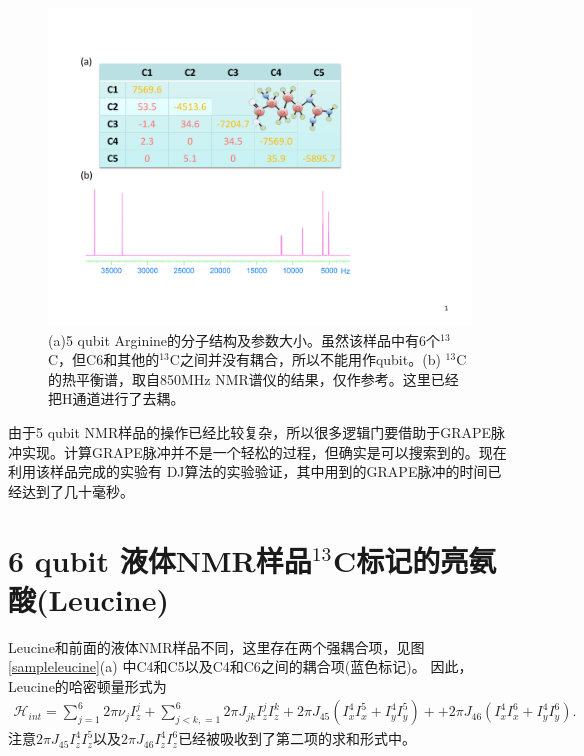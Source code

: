 \begin{figure}[htbp]
            \begin{center}
              \includegraphics[width= 0.8\columnwidth]{figures/samplearginine.pdf}
              \caption{(a)5 qubit Arginine的分子结构及参数大小。虽然该样品中有6个$^{13}$C，但C6和其他的$^{13}$C之间并没有耦合，所以不能用作qubit。(b) $^{13}$C的热平衡谱，取自850MHz NMR谱仪的结果，仅作参考。这里已经把H通道进行了去耦。}
              \label{samplearginine}
            \end{center}
\end{figure}

由于5 qubit NMR样品的操作已经比较复杂，所以很多逻辑门要借助于GRAPE脉冲实现。计算GRAPE脉冲并不是一个轻松的过程，但确实是可以搜索到的。现在利用该样品完成的实验有
 DJ算法的实验验证\cite{app27}，其中用到的GRAPE脉冲的时间已经达到了几十毫秒。

\section{6 qubit 液体NMR样品$^{13}$C标记的亮氨酸(Leucine)}

Leucine和前面的液体NMR样品不同，这里存在两个强耦合项，见图\ref{sampleleucine}(a) 中C4和C5以及C4和C6之间的耦合项(蓝色标记)。
因此，Leucine的哈密顿量形式为
\begin{eqnarray}
\mathcal{H}_{int}=\sum\limits_{j=1}^6 {2\pi \nu _j } I_z^j  + \sum\limits_{j < k,=1}^6 {2\pi} J_{jk} I_z^j I_z^k+{2\pi} J_{45} (I_x^4 I_x^5+I_y^4 I_y^5)++{2\pi} J_{46} (I_x^4 I_x^6+I_y^4 I_y^6).
\end{eqnarray}
注意${2\pi} J_{45}I_z^4 I_z^5$以及${2\pi} J_{46}I_z^4 I_z^6$已经被吸收到了第二项的求和形式中。

